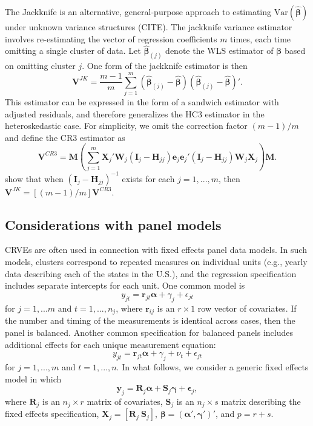 \documentclass[12pt]{article}\usepackage[]{graphicx}\usepackage[]{color}
\newcommand{\Var}{\text{Var}}
\newcommand{\bm}{\mathbf}
\newcommand{\bs}{\boldsymbol}
\begin{document}
The Jackknife is an alternative, general-purpose approach to estimating $\Var\left(\bs{\hat\beta}\right)$ under unknown variance structures (CITE). 
The jackknife variance estimator involves re-estimating the vector of regression coefficients $m$ times, each time omitting a single cluster of data. 
Let $\bs{\hat\beta}_{(j)}$ denote the WLS estimator of $\bs\beta$ based on omitting cluster $j$. 
One form of the jackknife estimator is then 
\begin{equation}
\label{eq:V_JK}
\bm{V}^{JK} = \frac{m - 1}{m} \sum_{j=1}^m \left(\bs{\hat\beta}_{(j)} - \bs{\hat\beta}\right) \left(\bs{\hat\beta}_{(j)} - \bs{\hat\beta}\right)'.
\end{equation}
This estimator can be expressed in the form of a sandwich estimator with adjusted residuals, and therefore generalizes the HC3 estimator in the heteroskedastic case. 
For simplicity, we omit the correction factor $(m - 1) / m$ and define the CR3 estimator as \[
\bm{V}^{CR3} = \bm{M}\left(\sum_{j=1}^m \bm{X}_j'\bm{W}_j \left(\bm{I}_j - \bm{H}_{jj}\right)\bm{e}_j \bm{e}_j' \left(\bm{I}_j - \bm{H}_{jj}\right) \bm{W}_j \bm{X}_j\right) \bm{M}. \]
\citet{Bell2002bias} show that when $\left(\bm{I}_j - \bm{H}_{jj}\right)^{-1}$ exists for each $j = 1,...,m$, then $\bm{V}^{JK} = [(m - 1) / m] \bm{V}^{CR3}$.  

\subsection{Considerations with panel models}

CRVEs are often used in connection with fixed effects panel data models. 
In such models, clusters correspond to repeated measures on individual units (e.g., yearly data describing each of the states in the U.S.), and the regression specification includes separate intercepts for each unit.
One common model is 
\[
y_{jt} = \bm{r}_{jt} \bs\alpha + \gamma_j + \epsilon_{jt} \]
for $j=1,...m$ and $t = 1,...,n_j$, where $\bm{r}_{ij}$ is an $r \times 1$ row vector of covariates. If the number and timing of the measurements is identical across cases, then the panel is balanced. Another common specification for balanced panels includes additional effects for each unique measurement equation:
\[
y_{jt} = \bm{r}_{jt} \bs\alpha + \gamma_j + \nu_t + \epsilon_{jt} \]
for $j=1,...,m$ and $t = 1,...,n$. 
In what follows, we consider a generic fixed effects model in which
\begin{equation}
\label{eq:fixed_effects}
\bm{y}_j = \bm{R}_j \bs\alpha + \bm{S}_j \bs\gamma + \bs\epsilon_j,
\end{equation}
where $\bm{R}_j$ is an $n_j \times r$ matrix of covariates, $\bm{S}_j$ is an $n_j \times s$ matrix describing the fixed effects specification, $\bm{X}_j = \left[\bm{R}_j \ \bm{S}_j\right]$, $\bs\beta = \left(\bs\alpha', \bs\gamma'\right)'$, and $p = r + s$. 
\end{document}
